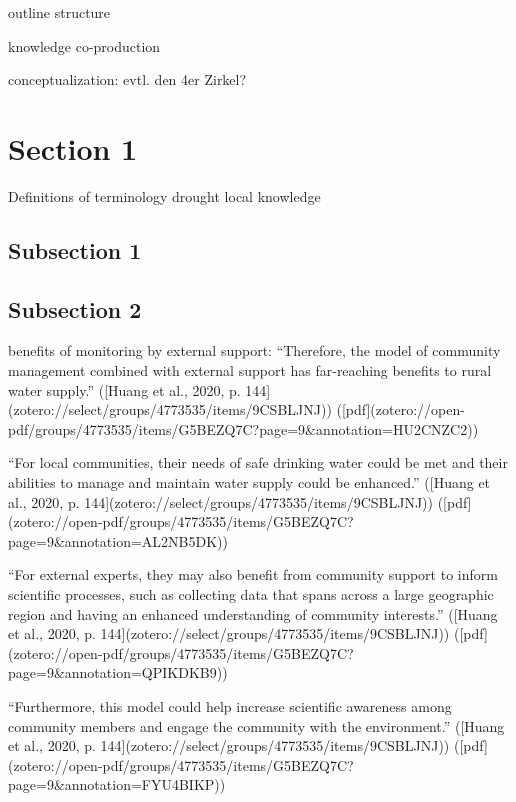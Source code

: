 outline structure

knowledge co-production
\autocite{dasInteractiveInformationCrowdsourcing2016}

conceptualization: evtl. den 4er Zirkel?


\section{Section 1}
Definitions of terminology
drought
local knowledge
\subsection{Subsection 1}



\subsection{Subsection 2}
benefits of monitoring by external support:
“Therefore, the model of community management combined with external support has far-reaching benefits to rural water supply.” ([Huang et al., 2020, p. 144](zotero://select/groups/4773535/items/9CSBLJNJ)) ([pdf](zotero://open-pdf/groups/4773535/items/G5BEZQ7C?page=9&annotation=HU2CNZC2))

“For local communities, their needs of safe drinking water could be met and their abilities to manage and maintain water supply could be enhanced.” ([Huang et al., 2020, p. 144](zotero://select/groups/4773535/items/9CSBLJNJ)) ([pdf](zotero://open-pdf/groups/4773535/items/G5BEZQ7C?page=9&annotation=AL2NB5DK))

“For external experts, they may also benefit from community support to inform scientific processes, such as collecting data that spans across a large geographic region and having an enhanced understanding of community interests.” ([Huang et al., 2020, p. 144](zotero://select/groups/4773535/items/9CSBLJNJ)) ([pdf](zotero://open-pdf/groups/4773535/items/G5BEZQ7C?page=9&annotation=QPIKDKB9))

“Furthermore, this model could help increase scientific awareness among community members and engage the community with the environment.” ([Huang et al., 2020, p. 144](zotero://select/groups/4773535/items/9CSBLJNJ)) ([pdf](zotero://open-pdf/groups/4773535/items/G5BEZQ7C?page=9&annotation=FYU4BIKP))

